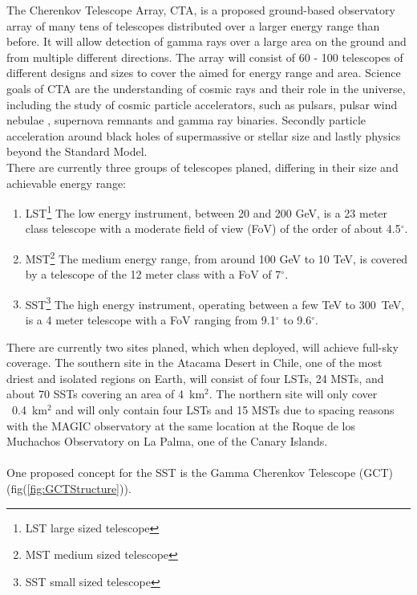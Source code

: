 \documentclass[12pt,article,type=msc,colorback,accentcolor=tud9c]{tudthesis}
\begin{document}
The Cherenkov Telescope Array, CTA, is a proposed ground-based observatory array of many tens of telescopes distributed over a larger energy range than before. It will allow detection of gamma rays over a large area on the ground and from multiple different directions. The array will consist of 60 - 100 telescopes of different designs and sizes to cover the aimed for energy range and area. Science goals of CTA are the understanding of cosmic rays and their role in the universe, including the study of cosmic particle accelerators, such as pulsars, pulsar wind nebulae , supernova remnants and gamma ray binaries. Secondly particle acceleration around black holes of supermassive or stellar size and lastly physics beyond the Standard Model.\\
There are currently three groups of telescopes planed, differing in their size and achievable energy range:\cite{CTADesign}
\begin{enumerate}
\item LST\footnote{LST large sized telescope} The low energy instrument, between 20 and 200 GeV, is a 23 meter class telescope with a moderate field of view (FoV) of the order of about 4.5$^\circ$.
\item MST\footnote{MST medium sized telescope} The medium energy range, from around 100 GeV to 10 TeV, is covered by a telescope of the 12 meter class with a FoV of 7$^\circ$.
\item SST\footnote{SST small sized telescope} The high energy instrument, operating between a few TeV to 300~TeV, is a 4 meter telescope with a FoV ranging from 9.1$^\circ$ to 9.6$^\circ$.
\end{enumerate}
There are currently two sites planed, which when deployed, will achieve full-sky coverage. The southern site in the Atacama Desert in Chile, one of the most driest and isolated regions on Earth, will consist of four LSTs, 24 MSTs, and about 70 SSTs covering an area of 4~km$^2$. The northern site will only cover ~0.4~km$^2$ and will only contain four LSTs and 15 MSTs due to spacing reasons with the MAGIC observatory at the same location at the Roque de los Muchachos Observatory on La Palma, one of the Canary Islands.\\\\
\noindent
One proposed concept for the SST is the Gamma Cherenkov Telescope (GCT) (fig(\ref{fig:GCTStructure})).\\
\end{document}
